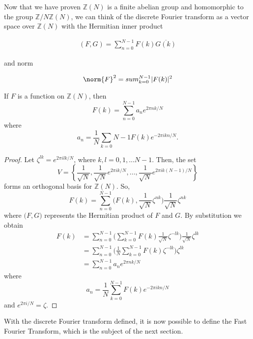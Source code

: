 \documentclass[../article.tex]{subfiles}
\begin{document}
Now that we have proven $\mathbb{Z}(N)$ is a finite abelian group and homomorphic to the group $\mathbb{Z} /N\mathbb{Z}(N)$, we can think of the discrete Fourier transform as a vector space over $\mathbb{Z}(N)$ with the Hermitian inner product

\begin{equation}
\begin{align}
(F,G) = \sum_{n=0}^{N-1} F(k) \overline{G(k)}
\end{align}
\end{equation}

and norm

\begin{equation}
\begin{align}

\norm{F}^2 = sum_{k=0}^{N-1} |F(k)|^2

\end{align}
\end{equation}

\begin{theorem}
If $F$ is a function on $\mathbb{Z}(N)$, then
\begin{equation}
F(k) = \sum_{n=0}^{N-1} a_n e^{2 \pi nk/N}
\end{equation}
where
\begin{equation}
a_n = \frac{1}{N} \sum_{k=0}{N-1} F(k) e^{-2 \pi ikn/N}.
\end{equation}
\end{theorem}
\begin{proof}
Let $\zeta^{lk} = e^{2 \pi i lk/N}$, where $k,l = 0,1,...N-1$. Then, the set
\begin{equation}
V = \left\{ \frac{1}{\sqrt{N}}, \frac{1}{\sqrt{N}}e^{2 \pi i k/N}, \ldots, \frac{1}{\sqrt{N}}e^{2 \pi i k(N-1)/N} \right\}
\end{equation}
forms an orthogonal basis for $\mathbb{Z}(N)$. So,
\begin{equation}
F(k) = \sum_{n=0}^{N-1} \Big(F(k), \frac{1}{\sqrt{N}}\zeta^{nk} \Big) \frac{1}{\sqrt{N}}\zeta^{nk}
\end{equation}
where $\big(F,G \big)$ represents the Hermitian product of $F$ and $G$. By substitution we obtain
\begin{equation}
\begin{split}
F(k) &= \sum_{n=0}^{N-1} \Bigg(\sum_{k=0}^{N-1} F(k) \frac{1}{\sqrt{N}} \zeta^{-lk} \Bigg) \frac{1}{\sqrt{N}} \zeta^{lk} \\
&= \sum_{n=0}^{N-1} \Bigg(\frac{1}{N} \sum_{k=0}^{N-1} F(k) \zeta^{-lk} \Bigg) \zeta^{lk} \\
&= \sum_{n=0}^{N-1} a_n e^{2 \pi nk/N}
\end{split}
\end{equation}
where
\begin{equation}
a_n = \frac{1}{N} \sum_{k=0}^{N-1} F(k) e^{-2 \pi ikn/N}
\end{equation}
and $e^{2 \pi i/N} = \zeta$.
\end{proof}

With the discrete Fourier transform defined, it is now possible to define the Fast Fourier Transform, which is the subject of the next section.
\end{document}
